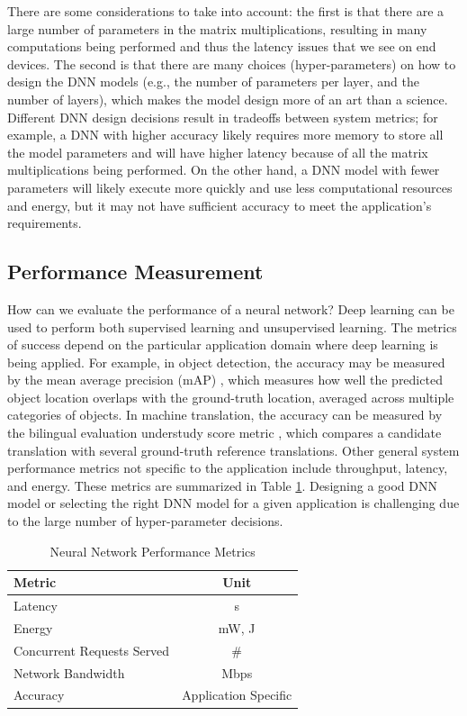 There are some considerations to take into account: the first is that there are a large number of parameters in the matrix multiplications, resulting in many computations being performed and thus the latency issues that we see on end devices. The second is that there are many choices (hyper-parameters) on how to design the DNN models (e.g., the number of parameters per layer, and the number of layers), which makes the model design more of an art than a science. Different DNN design decisions result in tradeoffs between system metrics; for example, a DNN with higher accuracy likely requires more memory to store all the model parameters and will have higher latency because of all the matrix multiplications being performed. On the other hand, a DNN model with fewer parameters will likely execute more quickly and use less computational resources and energy, but it may not have sufficient accuracy to meet the application's requirements.


\subsection{Performance Measurement}
How can we evaluate the performance of a neural network?
Deep learning can be used to perform both supervised learning and unsupervised learning. The metrics of success depend on the particular application domain where deep learning is being applied. For example, in object detection, the accuracy may be measured by the mean average precision (mAP) \cite{ILSVRC15}, which measures how well the predicted object location overlaps with the ground-truth location, averaged across multiple categories of objects. In machine translation, the accuracy can be measured by the bilingual evaluation understudy score metric \cite{10.3115/1073083.1073135}, which compares a candidate translation with several ground-truth reference translations. 
Other general system performance metrics not specific to the application include throughput, latency, and energy. These metrics are summarized in Table \ref{tab:NN-Perfomance-Metrics}.
Designing a good DNN model or selecting the right DNN model for a given application is challenging due to the large number of hyper-parameter decisions.

\begin{table}[htbp]
	\centering
	\begin{tabular}{|l||c|} 
	\hline 
	 Metric & Unit	\\
	\hline
	Latency  &	s	\\
	Energy	& mW, J	\\
	Concurrent Requests Served	&	\#  \\
	Network Bandwidth	& Mbps			  \\
	Accuracy & Application Specific		\\
	\hline
	\end{tabular}
	\caption{Neural Network Performance Metrics\label{tab:NN-Perfomance-Metrics}}
\end{table}


